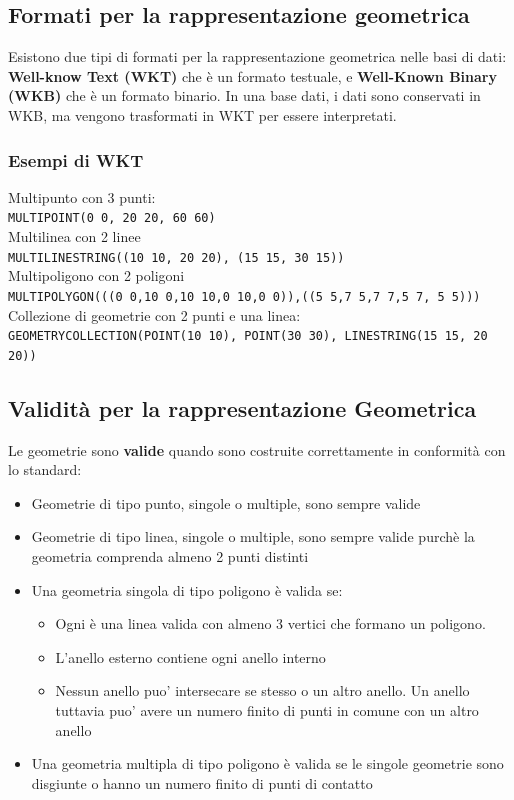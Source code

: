 \documentclass[a4paper,12pt]{article}
\begin{document}
\subsection{Formati per la rappresentazione geometrica}
Esistono due tipi di formati per la rappresentazione geometrica nelle basi di dati: \textbf{Well-know Text (WKT)} che è un formato testuale, e \textbf{Well-Known Binary (WKB)} che è un formato binario. In una base dati, i dati sono conservati in WKB, ma vengono trasformati in WKT per essere interpretati.

\subsubsection{Esempi di WKT}
Multipunto con 3 punti:\\
\texttt{MULTIPOINT(0 0, 20 20, 60 60)}\\

\noindent Multilinea con 2 linee\\
\texttt{MULTILINESTRING((10 10, 20 20), (15 15, 30 15))}\\

\noindent Multipoligono con 2 poligoni\\
\texttt{MULTIPOLYGON(((0 0,10 0,10 10,0 10,0 0)),((5 5,7 5,7 7,5 7, 5 5)))}\\

\noindent Collezione di geometrie con 2 punti e una linea:\\
\texttt{GEOMETRYCOLLECTION(POINT(10 10), POINT(30 30), LINESTRING(15 15, 20 20))}\\

\subsection{Validità per la rappresentazione Geometrica}
Le geometrie sono \textbf{valide} quando sono costruite correttamente in conformità con lo standard:
\begin{itemize}
\item Geometrie di tipo punto, singole o multiple, sono sempre valide
\item Geometrie di tipo linea, singole o multiple, sono sempre valide purchè la geometria comprenda almeno 2 punti distinti
\item Una geometria singola di tipo poligono è valida se: 
	\begin{itemize}
	\item Ogni è una linea valida con almeno 3 vertici che formano un poligono.
	\item L’anello esterno contiene ogni anello interno
	\item Nessun anello puo’ intersecare se stesso o un altro anello. Un anello tuttavia puo’ avere un numero finito di punti in comune con un altro anello
	\end{itemize}
\item Una geometria multipla di tipo poligono è valida se le singole geometrie sono disgiunte o hanno un numero finito di punti di contatto
\end{itemize}
\end{document}
